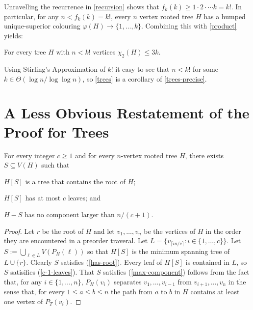 \documentclass[kpfonts]{patmorin}
\newcommand{\uqs}{\chi_2}
\begin{document}
Unravelling the recurrence in \cref{recursion} shows that $f_k(k)\ge 1\cdot2\cdot\cdots k=k!$.  In particular, for any $n < f_k(k)=k!$, every $n$ vertex rooted tree $H$ has a humped unique-superior colouring $\varphi(H)\to\{1,\ldots,k\}$. Combining this with \cref{product} yields:

\begin{thm}\label{trees-precise}
    For every tree $H$ with $n<k!$ vertices $\uqs(H)\le 3k$.
\end{thm}

Using Stirling's Approximation of $k!$ it easy to see that $n < k!$ for some $k\in\Theta(\log n/\log\log n)$, so \cref{trees} is a corollary of \cref{trees-precise}.

\section{A Less Obvious Restatement of the Proof for Trees}

\begin{lem}\label{tree-separator}
    For every integer $c\ge 1$ and for every $n$-vertex rooted tree $H$, there exists $S\subseteq V(H)$ such that
    \begin{inparaenum}[(i)]
        \item $H[S]$ is a tree that contains the root of $H$; \label{has-root}
        \item $H[S]$ has at most $c$ leaves; and \label{c-1-leaves}
        \item $H-S$ has no component larger than $n/(c+1)$. \label{max-component}
    \end{inparaenum}
\end{lem}

\begin{proof}
    Let $r$ be the root of $H$ and let $v_1,\ldots,v_n$ be the vertices of $H$ in the order they are encountered in a preorder traveral.  Let $L=\{v_{\lceil in/c\rceil}: i\in\{1,\ldots,c\}\}$.  Let $S:=\bigcup_{\ell\in L} V(P_H(\ell))$ so that $H[S]$ is the minimum spanning tree of $L\cup\{r\}$.  Clearly $S$ satisfies (\ref{has-root}).  Every leaf of $H[S]$ is contained in $L$, so $S$ satisifies (\ref{c-1-leaves}).  That $S$ satisfies (\ref{max-component}) follows from the fact that, for any $i\in\{1,\ldots,n\}$, $P_H(v_i)$ separates $v_1,\ldots,v_{i-1}$ from $v_{i+1},\ldots,v_n$ in the sense that, for every $1\le a\le b\le n$ the path from $a$ to $b$ in $H$ contains at least one vertex of $P_T(v_i)$.
\end{proof}
\end{document}
